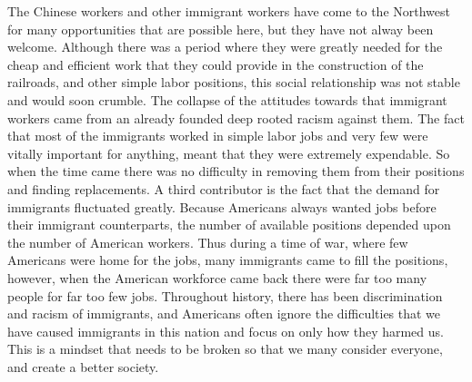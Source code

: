 \documentclass[12pt, twoside]{article}
\begin{document}
The Chinese workers and other immigrant workers have come to the Northwest for many opportunities that are possible here, but they have not alway been welcome. Although there was a period where they were greatly needed for the cheap and efficient work that they could provide in the construction of the railroads, and other simple labor positions, this social relationship was not stable and would soon crumble. The collapse of the attitudes towards that immigrant workers came from an already founded deep rooted racism against them. The fact that most of the immigrants worked in simple labor jobs and very few were vitally important for anything, meant that they were extremely expendable. So when the time came there was no difficulty in removing them from their positions and finding replacements. A third   contributor is the fact that the demand for immigrants fluctuated greatly. Because Americans always wanted jobs before their immigrant counterparts, the number of available positions depended upon the number of American workers. Thus during a time of war, where few Americans were home for the jobs, many immigrants came to fill the positions, however, when the American workforce came back there were far too many people for far too few jobs. Throughout history, there has been discrimination and racism of immigrants, and Americans often ignore the difficulties that we have caused immigrants in this nation and focus on only how they harmed us. This is a mindset that needs to be broken so that we many consider everyone, and create a better society.
\newpage
\printbibliography
\end{document}
